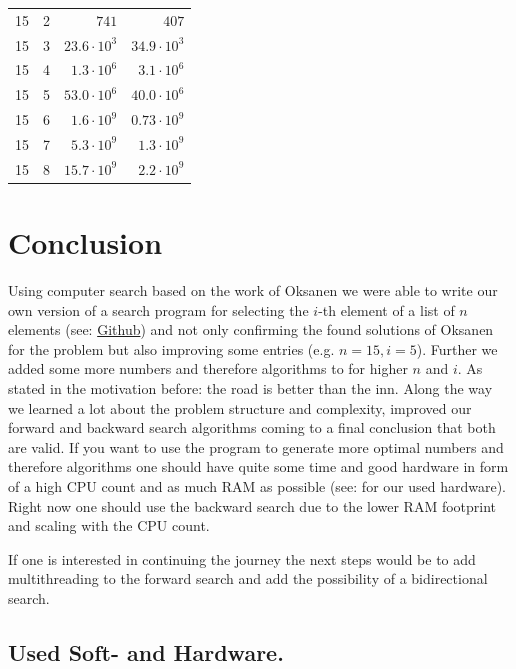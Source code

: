 \documentclass[twoside,leqno,twocolumn]{article}
\begin{document}
\begin{table}[!t]
\begin{tabular}{c|c|r|r}
    15  & 2   & $741$                   & $407$                    \\
    15  & 3   & $23.6 \cdot 10^3$       & $34.9 \cdot 10^3$        \\
    15  & 4   & $1.3 \cdot 10^6$        & $3.1 \cdot 10^6$         \\
    15  & 5   & $53.0 \cdot 10^6$       & $40.0 \cdot 10^6$        \\
    15  & 6   & $1.6 \cdot 10^9$        & $0.73 \cdot 10^9$        \\
    15  & 7   & $5.3 \cdot 10^9$        & $1.3 \cdot 10^9$         \\
    15  & 8   & $15.7 \cdot 10^9$       & $2.2 \cdot 10^9$         \\
  \end{tabular}
\end{table}


\section{Conclusion}

Using computer search based on the work of Oksanen we were able to write our own version of a search program for selecting the $i$-th element of a list of $n$ elements (see: \href{https://github.com/JGDoerrer/selection_generator}{Github}) and not only confirming the found solutions of Oksanen for the problem but also improving some entries (e.g. $n = 15, i = 5$).
Further we added some more numbers and therefore algorithms to  for higher $n$ and $i$.
As stated in the motivation before: the road is better than the inn.
Along the way we learned a lot about the problem structure and complexity, improved our forward and backward search algorithms coming to a final conclusion that both are valid.
If you want to use the program to generate more optimal numbers and therefore algorithms one should have quite some time and good hardware in form of a high CPU count and as much RAM as possible (see:  for our used hardware).
Right now one should use the backward search due to the lower RAM footprint and scaling with the CPU count.

If one is interested in continuing the journey the next steps would be to add multithreading to the forward search and add the possibility of a bidirectional search.


\subsection{Used Soft- and Hardware.} \label{sec:hardware}
\end{document}
